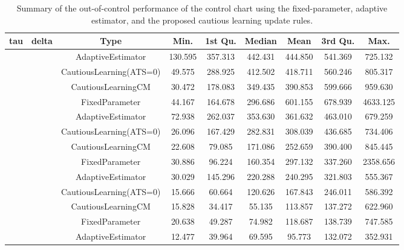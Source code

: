 \begin{table}[!h]

\caption{Summary of the out-of-control performance of the control chart using the fixed-parameter, adaptive estimator, and the proposed cautious learning update rules.}
\centering
\begin{tabular}[t]{ccccccccc}
\toprule
tau & delta & Type & Min. & 1st Qu. & Median & Mean & 3rd Qu. & Max.\\
\midrule
 &  & AdaptiveEstimator & 130.595 & 357.313 & 442.431 & 444.850 & 541.369 & 725.132\\

 &  & CautiousLearning(ATS=0) & 49.575 & 288.925 & 412.502 & 418.711 & 560.246 & 805.317\\

 &  & CautiousLearningCM & 30.472 & 178.083 & 349.435 & 390.853 & 599.666 & 959.630\\

 & \multirow[t]{-4}{*}{\centering\arraybackslash 0.25} & FixedParameter & 44.167 & 164.678 & 296.686 & 601.155 & 678.939 & 4633.125\\
\cmidrule{2-9}
 &  & AdaptiveEstimator & 72.938 & 262.037 & 353.630 & 361.632 & 463.010 & 679.259\\

 &  & CautiousLearning(ATS=0) & 26.096 & 167.429 & 282.831 & 308.039 & 436.685 & 734.406\\

 &  & CautiousLearningCM & 22.608 & 79.085 & 171.086 & 252.659 & 390.400 & 845.445\\

 & \multirow[t]{-4}{*}{\centering\arraybackslash 0.35} & FixedParameter & 30.886 & 96.224 & 160.354 & 297.132 & 337.260 & 2358.656\\
\cmidrule{2-9}
 &  & AdaptiveEstimator & 30.029 & 145.296 & 220.288 & 240.295 & 321.803 & 555.367\\

 &  & CautiousLearning(ATS=0) & 15.666 & 60.664 & 120.626 & 167.843 & 246.011 & 586.392\\

 &  & CautiousLearningCM & 15.828 & 34.417 & 55.135 & 113.857 & 137.272 & 622.960\\

 & \multirow[t]{-4}{*}{\centering\arraybackslash 0.50} & FixedParameter & 20.638 & 49.287 & 74.982 & 118.687 & 138.739 & 747.585\\
\cmidrule{2-9}
 &  & AdaptiveEstimator & 12.477 & 39.964 & 69.595 & 95.773 & 132.072 & 352.931\\


\end{tabular}
\end{table}

